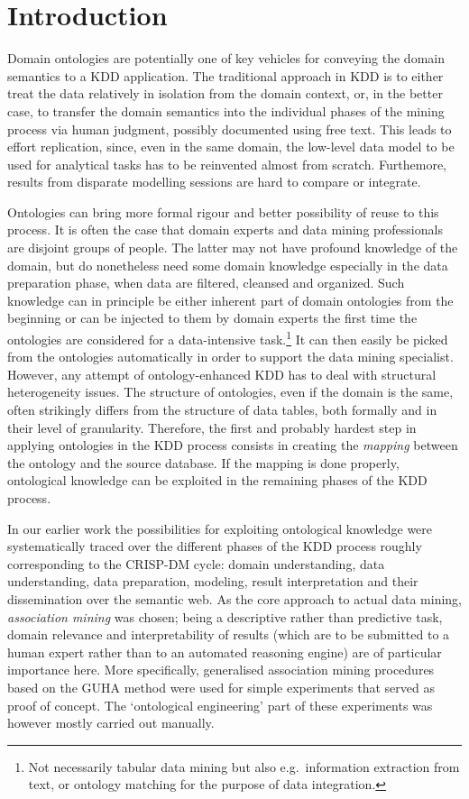 \section{Introduction} \label{Introduction}

Domain ontologies are potentially one of key vehicles for conveying the domain semantics to a KDD application. 
The traditional approach in KDD is to either treat the data relatively in isolation from the domain context, or, in the better case, to transfer the domain semantics into the individual phases of the mining process via human judgment, possibly documented using free text.
This leads to effort replication, since, even in the same domain, the low-level data model to be used for analytical tasks has to be reinvented almost from scratch. 
Furthemore, results from disparate modelling sessions are hard to compare or integrate.

Ontologies can bring more formal rigour and better possibility of reuse to this process. 
It is often the case that domain experts and data mining professionals are disjoint groups of people.
The latter may not have profound knowledge of the domain, but do nonetheless need some domain knowledge especially in the data preparation phase, when data are filtered, cleansed and organized. 
Such knowledge can in principle be either inherent part of domain ontologies from the beginning or can be injected to them by domain experts the first time the ontologies are considered for a data-intensive task.\footnote{Not necessarily tabular data mining but also e.g.~information extraction from text, or ontology matching for the purpose of data integration.}
It can then easily be picked from the ontologies automatically in order to support the data mining specialist.
However, any attempt of ontology-enhanced KDD has to deal with structural heterogeneity issues. 
The structure of ontologies, even if the domain is the same, often strikingly differs from the structure of data tables, both formally and in their level of granularity. 
Therefore, the first and probably hardest step in applying ontologies in the KDD process consists in creating the \emph{mapping} between the ontology and the source database.
If the mapping is done properly, ontological knowledge can be exploited in the remaining phases of the KDD process.

In our earlier work \cite{Ontology} the possibilities for exploiting ontological knowledge were systematically traced over the different phases of the KDD process roughly corresponding to the CRISP-DM cycle: domain understanding, data understanding, data preparation, modeling, result interpretation and their dissemination over the semantic web. 
As the core approach to actual data mining, \emph{association mining} was chosen; being a descriptive rather than predictive task, domain relevance and interpretability of results (which are to be submitted to a human expert rather than to an automated reasoning engine) are of particular importance here.
More specifically, generalised association mining procedures based on the GUHA method \cite{GUHA} were used for simple experiments that served as proof of concept.
The `ontological engineering' part of these experiments was however mostly carried out manually.

